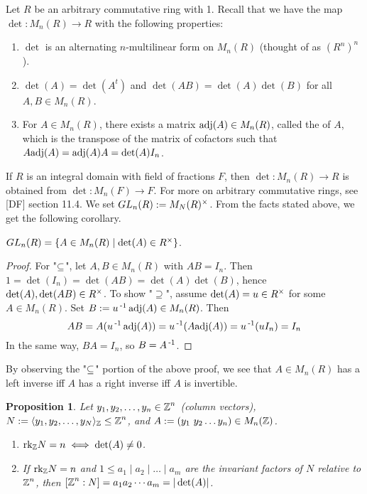 \documentclass[11pt]{book}
\newcounter{counter}
\newtheorem{proposition}[counter]{Proposition}   \newtheorem{problem}[counter]{Problem}   \newtheorem*{proposition*}{Proposition}   \newtheorem*{lemma*}{Lemma}
\theoremstyle{definition}   \newtheorem{defn}[counter]{Definition} %
\newcommand{\gen}[1]{\langle #1 \rangle}   \newcommand{\stab}[2]{\tn{Stab}_{#1}(#2)}   \newcommand{\fix}[2]{\tn{Fix}_{#1}(#2)}   \newcommand{\op}{^{\tn{op}}}
\DeclareMathOperator{\ra}{\rightarrow}   \DeclareMathOperator{\Poly}{\mathbf{P}}   \DeclareMathOperator{\spn}{\textnormal{span}}   \DeclareMathOperator{\aut}{\textnormal{Aut}}
\newcommand{\vs}{\vspace{8pt}}
\numberwithin{counter}{chapter}
\begin{document}
Let $R$ be an arbitrary commutative ring with 1. Recall that we have the map $\det : M_n(R) \ra R$ with the following properties:
\begin{enumerate}
\item[$\bullet$] $\det$ is an alternating $n$-multilinear form on $M_n(R)$ (thought of as $(R^n)^n$).
\item[$\bullet$] $\det(A) = \det (A^t)$ and $\det (AB) = \det (A) \det (B)$ for all $A,B \in M_n(R)$.
\item[$\bullet$] For $A \in M_n(R)$, there exists a matrix $\textnormal{adj}(A) \in M_n(R)$, called the  of $A$, which is the transpose of the matrix of cofactors such that $A \textnormal{adj}(A) = \textnormal{adj}(A) A = \det(A) I_n$.
\end{enumerate}

If $R$ is an integral domain with field of fractions $F$, then $\det : M_n(R) \ra R$ is obtained from $\det : M_n(F) \ra F$. For more on arbitrary commutative rings, see [DF] section 11.4. We set $GL_n(R) := M_N(R)^{\times}$. From the facts stated above, we get the following corollary.

\begin{corollary}
$GL_n(R) = \{A \in M_n(R) \mid \det (A) \in R^{\times}\}$.
\end{corollary}

\begin{proof}
For "$\operatorname{\subseteq}$", let $A,B \in M_n(R)$ with $AB = I_n$. Then $1 = \det (I_n) = \det(AB) = \det (A) \det (B)$, hence $\det(A),\det(AB) \in R^{\times}$. To show "$\supseteq$", assume $\det(A)= u\in R^{\times}$ for some $A \in M_n(R)$. Set $B := u\operatorname{^{-1}} \textnormal{adj}(A) \in M_n(R)$. Then
	\[AB = A (u\operatorname{^{-1}} \textnormal{adj}(A)) = u\operatorname{^{-1}} (A \textnormal{adj}(A)) = u\operatorname{^{-1}}(u I_n) = I_n \]
In the same way, $BA = I_n$, so $B = A\operatorname{^{-1}}$.
\end{proof}

\vs

\noindent {} By observing the "$\operatorname{\subseteq}$" portion of the above proof, we see that $A \in M_n(R)$ has a left inverse iff $A$ has a right inverse iff $A$ is invertible.

\vs

\begin{proposition}
Let $y_1,y_2,\dots,y_n \in \operatorname{\mathbb{Z}}^n$ (column vectors), $N := \gen{y_1,y_2,\dots,y_N}_{\z} \leq \z^n$, and $A:= (y_1 \ y_2 \dots y_n) \in M_n(\operatorname{\mathbb{Z}})$.
\begin{enumerate}
\item[(a)] $\textnormal{rk}_{\operatorname{\mathbb{Z}}} N = n \iff \det (A) \ne 0$.
\item[(b)] If $\textnormal{rk}_{\operatorname{\mathbb{Z}}} N = n$ and $1 \leq a_1 \mid a_2 \mid \dots \mid a_m$ are the invariant factors of $N$ relative to $\operatorname{\mathbb{Z}}^n$, then $[\operatorname{\mathbb{Z}}^n : N] = a_1 a_2 \cdots a_m = |\det(A)|$.
\end{enumerate}
\end{proposition}\ \\
\end{document}
